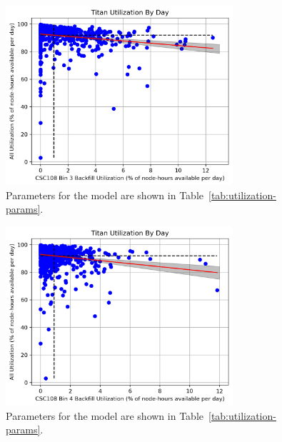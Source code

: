 \begin{figure}
  \includegraphics[width=0.75\textwidth]{images/linfit-utilization-by-true-day-bin3.png}
\caption{Parameters for the model are shown in
    Table~\ref{tab:utilization-params}.}
\label{fig:utilization-bin3}
\end{figure}


\begin{figure}
  \includegraphics[width=0.75\textwidth]{images/linfit-utilization-by-true-day-bin4.png}
\caption{Parameters for the model are shown in
    Table~\ref{tab:utilization-params}.}
\label{fig:utilization-bin4}
\end{figure}


